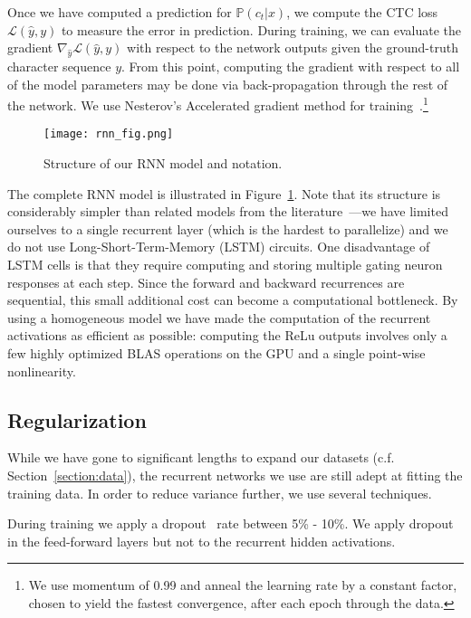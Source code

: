 \documentclass{article}
\begin{document}
Once we have computed a prediction for $\mathbb{P}(c_t|x)$, we compute the CTC
loss~\cite{Graves2006} $\mathcal{L}(\hat{y}, y)$ to measure the error in
prediction.  During training, we can evaluate the gradient $\nabla_{\hat{y}}
\mathcal{L}(\hat{y}, y)$ with respect to the network outputs given the
ground-truth character sequence $y$.  From this point, computing the gradient
with respect to all of the model parameters may be done via back-propagation
through the rest of the network. We use Nesterov's Accelerated gradient method
for training~\cite{sutskever2013nag}.\footnote{We use momentum of 0.99 and
anneal the learning rate by a constant factor, chosen to yield the fastest
convergence, after each epoch through the data.}

\begin{figure}[th]
\centering
 \texttt{[image: rnn\_fig.png]}
  \caption{Structure of our RNN model and notation.}
  \label{fig:rnn}
\end{figure}

The complete RNN model is illustrated in Figure~\ref{fig:rnn}.  Note that its
structure is considerably simpler than related models from the
literature~\cite{Graves2014}---we have limited ourselves to a single recurrent
layer (which is the hardest to parallelize) and we do not use
Long-Short-Term-Memory (LSTM) circuits.  One disadvantage of LSTM cells is that
they require computing and storing multiple gating neuron responses at each
step.  Since the forward and backward recurrences are sequential, this small
additional cost can become a computational bottleneck.  By using a homogeneous
model we have made the computation of the recurrent activations as efficient as
possible:  computing the ReLu outputs involves only a few highly optimized BLAS
operations on the GPU and a single point-wise nonlinearity.

\subsection{Regularization}
While we have gone to significant lengths to expand our datasets (c.f.
Section~\ref{section:data}), the recurrent networks we use are still adept at
fitting the training data.  In order to reduce variance further, we use several
techniques.  

During training we apply a dropout~\cite{hinton2012dropout} rate between 5\% -
10\%. We apply dropout in the feed-forward layers but not to the recurrent
hidden activations.
\end{document}
